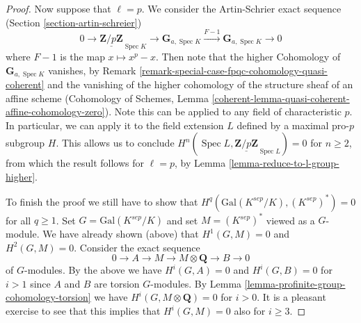 \documentclass[10pt,a4paper]{amsart}
\theoremstyle{plain}
\theoremstyle{definition}
\theoremstyle{remark}
\numberwithin{equation}{subsection}
\def\Spec{\mathop{\mathrm{Spec}}}
\begin{document}
\begin{proof}
\medskip\noindent
Now suppose that $\ell = p$. We consider the
Artin-Schrier exact sequence (Section \ref{section-artin-schreier})
$$
0 \longrightarrow \underline{\mathbf{Z}/p\mathbf{Z}}_{\Spec{K}} \longrightarrow
\mathbf{G}_{a, \Spec{K}} \xrightarrow{F-1} \mathbf{G}_{a, \Spec{K}} 
\longrightarrow 0
$$
where $F - 1$ is the map $x \mapsto x^p - x$. Then note that the higher 
Cohomology of $\mathbf{G}_{a, \Spec{K}}$ vanishes, by
Remark \ref{remark-special-case-fpqc-cohomology-quasi-coherent} and the 
vanishing of the higher cohomology of the structure sheaf of an affine scheme
(Cohomology of Schemes, Lemma
\ref{coherent-lemma-quasi-coherent-affine-cohomology-zero}).
Note this can be applied to any field of 
characteristic $p$. In particular, we can apply it to the field extension $L$ 
defined by a maximal pro-$p$ subgroup $H$. This allows us to conclude 
$H^n(\Spec{L}, \underline{\mathbf{Z}/p\mathbf{Z}}_{\Spec{L}}) = 0$
for $n \geq 2$, from which the result follows for $\ell = p$, by
Lemma \ref{lemma-reduce-to-l-group-higher}.

\medskip\noindent
To finish the proof we still have to show that
$H^q(\text{Gal}(K^{sep}/K), (K^{sep})^*) = 0$ for all $q \geq 1$.
Set $G = \text{Gal}(K^{sep}/K)$ and set $M = (K^{sep})^*$
viewed as a $G$-module. We have already shown (above) that
$H^1(G, M) = 0$ and $H^2(G, M) = 0$. Consider the exact sequence
$$
0 \to A \to M \to M \otimes \mathbf{Q} \to B \to 0
$$
of $G$-modules. By the above we have $H^i(G, A) = 0$
and $H^i(G, B) = 0$ for $i > 1$ since $A$ and $B$ are
torsion $G$-modules. By
Lemma \ref{lemma-profinite-group-cohomology-torsion}
we have $H^i(G, M \otimes \mathbf{Q}) = 0$ for $i > 0$.
It is a pleasant exercise to see that this implies that
$H^i(G, M) = 0$ also for $i \geq 3$.
\end{proof}
\end{document}
